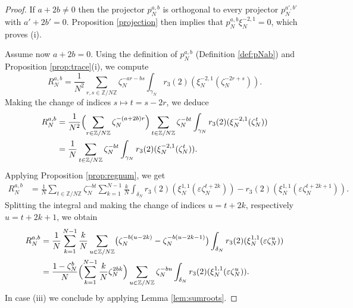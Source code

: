\documentclass[11pt,a4,leqno]{amsart}
\theoremstyle{my theoremstyle}
\theoremstyle{dfn}
\theoremstyle{remark}
\renewcommand{\1}{\mathbbm{1}}
\newcommand{\Z}{\mathbb{Z}}
\newcommand{\e}{\varepsilon}
\numberwithin{equation}{section}
\begin{document}
\begin{proof}
    If $a+2b \neq 0$ then the projector $p_N^{a,b}$ is orthogonal to every projector $p_N^{a',b'}$ with $a'+2b'=0$. Proposition \ref{projection} then implies that $p_N^{a,b} \xi_N^{-2,1}=0$, which proves (i).
    
    Assume now $a+2b=0$. Using the definition of $p_N^{a,b}$ (Definition \ref{def:pNab}) and Proposition \ref{prop:trace}(i), we compute
    \begin{equation*}
        R_N^{a,b} = \frac{1}{N^2} \sum_{r,s \in \Z/N\Z} \zeta_N^{-ar-bs} \int_{\gamma_N} r_3(2)(\xi_N^{-2,1}(\zeta_N^{-2r+s})).
    \end{equation*}
    Making the change of indices $s \mapsto t = s-2r$, we deduce
    \begin{align*}
        R_N^{a,b} & = \frac{1}{N^2} \Bigl(\sum_{r \in \Z/N\Z} \zeta_N^{-(a+2b)r} \Bigr) \sum_{t \in \Z/N\Z} \zeta_N^{-bt} \int_{\gamma_N} r_3(2)(\xi_N^{-2,1}(\zeta_N^t)) \\
        & = \frac{1}{N} \sum_{t \in \Z/N\Z} \zeta_N^{-bt} \int_{\gamma_N} r_3(2)(\xi_N^{-2,1}(\zeta_N^t)).
    \end{align*}
    Applying Proposition \ref{prop:regnum}, we get
    \begin{align*}
        R_N^{a,b} & = \frac{1}{N} \sum_{t \in \Z/N\Z} \zeta_N^{-bt} \sum_{k=1}^{N-1} \frac{k}{N} \int_{\delta_N} r_3(2)(\xi_N^{1,1}(\e \zeta_N^{t+2k})) - r_3(2)(\xi_N^{1,1}(\e \zeta_N^{t+2k+1})).
    \end{align*}
    Splitting the integral and making the change of indices $u = t+2k$, respectively $u = t+2k+1$, we obtain
    \begin{align}
    \nonumber
    R_N^{a,b} & = \frac{1}{N} \sum_{k=1}^{N-1} \frac{k}{N} \sum_{u \in \Z/N\Z} \bigl(\zeta_N^{-b(u-2k)} - \zeta_N^{-b(u-2k-1)}\bigr) \int_{\delta_N} r_3(2)(\xi_N^{1,1}(\e \zeta_N^u)) \\
    \label{eq:regR}
    & = \frac{1-\zeta_N^b}{N} \Bigl(\sum_{k=1}^{N-1} \frac{k}{N} \zeta_N^{2bk} \Bigr) \sum_{u \in \Z/N\Z} \zeta_N^{-bu} \int_{\delta_N} r_3(2)(\xi_N^{1,1}(\e \zeta_N^u)).
    \end{align}
    In case (iii) we conclude by applying Lemma \ref{lem:sumroots}.
    

\end{proof}
\end{document}
